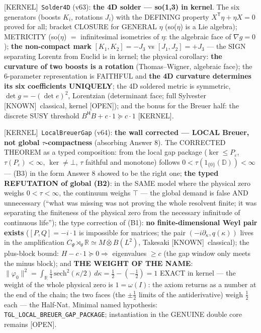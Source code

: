 \documentclass[11pt]{article}
\providecommand{\kernelmk}[1]{\textsf{[KERNEL]}~\texttt{#1}}\providecommand{\knownmk}[1]{\textsf{[KNOWN]}~{#1}}\providecommand{\statusmk}[1]{\textsf{[#1]}}
\theoremstyle{definition}\newtheorem{deriv}{Derivation}
\begin{document}
\kernelmk{Solder4D} (v63): \textbf{the 4D solder --- so(1,3) in kernel}. The six generators (boosts $K_i$, rotations $J_i$) with the DEFINING property $X^\mathsf{T}\eta+\eta X=0$ proved for all; bracket CLOSURE for GENERAL $\eta$ (so($\eta$) is a Lie algebra); METRICITY (so($\eta$) $=$ infinitesimal isometries of $\eta$: the algebraic face of $\nabla g=0$); \textbf{the non-compact mark} $[K_1,K_2]=-J_3$ vs $[J_1,J_2]=+J_3$ --- the SIGN separating Lorentz from Euclid is in kernel; the physical corollary: \textbf{the curvature of two boosts is a rotation} (Thomas--Wigner, algebraic face); the 6-parameter representation is FAITHFUL and \textbf{the 4D curvature determines its six coefficients UNIQUELY}; the 4D soldered metric is symmetric, $\det g=-(\det e)^2$, Lorentzian (determinant face; full Sylvester \knownmk{classical}, kernel \statusmk{OPEN}); and the bonus for the Breuer half: the discrete SUSY threshold $B^\mathsf{H}B+c\cdot1\succeq c\cdot1$ [KERNEL].

\kernelmk{LocalBreuerGap} (v64): \textbf{the wall corrected --- LOCAL Breuer, not global $\tau$-compactness} (absorbing Answer 8). The CORRECTED THEOREM as a typed composition: from the local gap package ($\ker\le P_\varepsilon$, $\tau(P_\varepsilon)<\infty$, $\ker\neq\bot$, $\tau$ faithful and monotone) follows $0<\tau(1_{\{0\}}(\mathbb D))<\infty$ --- (B3) in the form Answer 8 showed to be the right one; \textbf{the typed REFUTATION of global (B2)}: in the SAME model where the physical zero weighs $0<\tau<\infty$, the continuum weighs $\top$ --- the global demand is false AND unnecessary (``what was missing was not proving the whole resolvent finite; it was separating the finiteness of the physical zero from the necessary infinitude of continuous life''); the type correction of (B1): \textbf{no finite-dimensional Weyl pair exists} ($[P,Q]=-i\cdot1$ is impossible for matrices; the pair $(-i\partial_\kappa,q(\kappa))$ lives in the amplification $C_\Psi\rtimes_\theta\mathbb R\simeq M\overline\otimes B(L^2)$, Takesaki \knownmk{classical}); the plus-block bound: $H-c\cdot1\succeq0\Rightarrow$ eigenvalues $\ge c$ (the gap window only meets the minus block); and \textbf{THE WEIGHT OF THE NAME}: $\|\varphi_0\|^2=\int_{\mathbb R}\tfrac14\,\mathrm{sech}^2(\kappa/2)\,d\kappa=\tfrac12-(-\tfrac12)=1$ EXACT in kernel --- the weight of the whole physical zero is $1=\omega(I)$: the axiom returns as a number at the end of the chain; the two faces (the $\pm\tfrac12$ limits of the antiderivative) weigh $\tfrac12$ each --- the Half-Nat. Minimal named hypothesis: \texttt{TGL\_LOCAL\_BREUER\_GAP\_PACKAGE}; instantiation in the GENUINE double core remains \statusmk{OPEN}.
\end{document}

